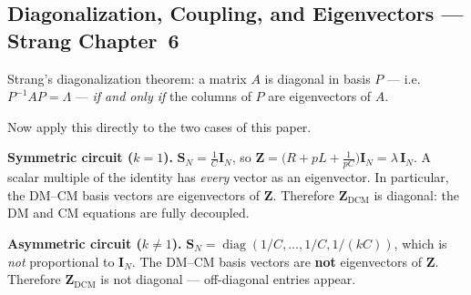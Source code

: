 \subsection{Diagonalization, Coupling, and Eigenvectors — Strang Chapter~6}

Strang's diagonalization theorem: a matrix $A$ is diagonal in basis
$P$ — i.e.\ $P^{-1}AP = \Lambda$ — \emph{if and only if} the
columns of $P$ are eigenvectors of $A$.

Now apply this directly to the two cases of this paper.

\textbf{Symmetric circuit ($k = 1$).}\;
$\mathbf{S}_N = \tfrac{1}{C}\mathbf{I}_N$, so
$\mathbf{Z} = \bigl(R + pL + \tfrac{1}{pC}\bigr)\mathbf{I}_N
             = \lambda\,\mathbf{I}_N$.
A scalar multiple of the identity has \emph{every} vector as an
eigenvector.  In particular, the DM--CM basis vectors are
eigenvectors of $\mathbf{Z}$.  Therefore $\mathbf{Z}_{\mathrm{DCM}}$
is diagonal: the DM and CM equations are fully decoupled.

\textbf{Asymmetric circuit ($k \neq 1$).}\;
$\mathbf{S}_N = \operatorname{diag}(1/C, \ldots, 1/C, 1/(kC))$,
which is \emph{not} proportional to $\mathbf{I}_N$.  The DM--CM
basis vectors are \textbf{not} eigenvectors of $\mathbf{Z}$.
Therefore $\mathbf{Z}_{\mathrm{DCM}}$ is not diagonal — off-diagonal
entries appear.


